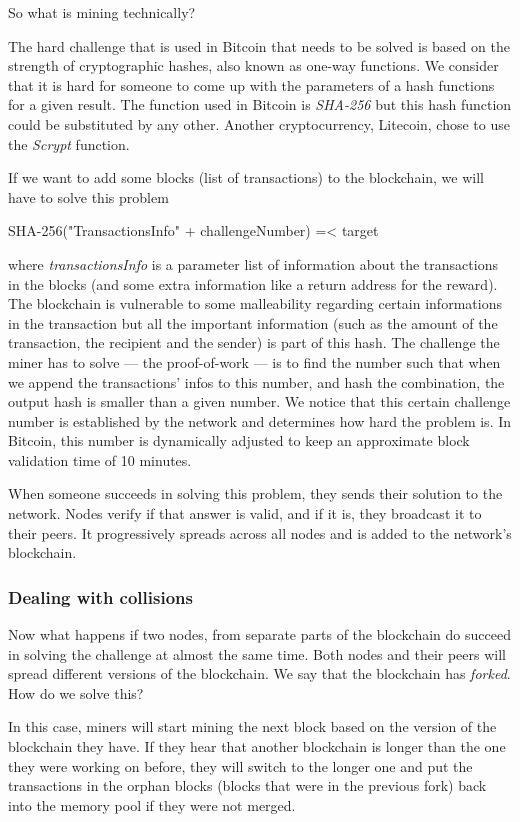 \documentclass{vldb}
\begin{document}
So what is mining technically?

The hard challenge that is used in Bitcoin that needs to be solved is based on the strength of cryptographic hashes, also known as one-way functions. We consider that it is hard for someone to come up with the parameters of a hash functions for a given result. The function used in Bitcoin is \emph{SHA-256} but this hash function could be substituted by any other. Another cryptocurrency, Litecoin, chose to use the \emph{Scrypt} function.

If we want to add some blocks (list of transactions) to the blockchain, we will have to solve this problem
\begin{center}
SHA-256("TransactionsInfo" + challengeNumber) =< target
\end{center}
where \emph{transactionsInfo} is a parameter list of information about the transactions in the blocks (and some extra information like a return address for the reward). The blockchain is vulnerable to some malleability regarding certain informations in the transaction but all the important information (such as the amount of the transaction, the recipient and the sender) is part of this hash.
The challenge the miner has to solve --- the proof-of-work --- is to find the number such that when we append the transactions' infos to this number, and hash the combination, the output hash is smaller than a given number.
We notice that this certain challenge number is established by the network and determines how hard the problem is. In Bitcoin, this number is dynamically adjusted to keep an approximate block validation time of 10 minutes.\cite{hashCash}

When someone succeeds in solving this problem, they sends their solution to the network. Nodes verify if that answer is valid, and if it is, they broadcast it to their peers. It progressively spreads across all nodes and is added to the network's blockchain. 

\subsubsection{Dealing with collisions}

Now what happens if two nodes, from separate parts of the blockchain do succeed in solving the challenge at almost the same time. Both nodes and their peers will spread different versions of the blockchain. We say that the blockchain has \emph{forked}. How do we solve this?

In this case, miners will start mining the next block based on the version of the blockchain they have. If they hear that another blockchain is longer than the one they were working on before, they will switch to the longer one and put the transactions in the orphan blocks (blocks that were in the previous fork) back into the memory pool if they were not merged. 
\end{document}
